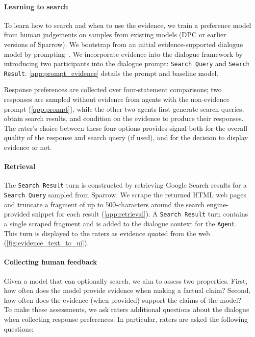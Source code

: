 \paragraph{Learning to search} To learn how to search and when to use the evidence, we train a preference model from human judgements on samples from existing models (DPC or earlier versions of Sparrow). We bootstrap from an initial evidence-supported dialogue model by prompting~\citep{lazaridou2022internet,menick2022teaching}. We incorporate evidence into the dialogue framework by introducing two participants into the dialogue prompt: \texttt{Search Query} and \texttt{Search Result}. \ref{app:prompt_evidence} details the prompt and baseline model.

Response preferences are collected over four-statement comparisons; two responses are sampled without evidence from agents with the non-evidence prompt (\ref{app:prompt}), while the other two agents first generate search queries, obtain search results, and condition on the evidence to produce their responses. The rater's choice between these four options provides signal both for the overall quality of the response and search query (if used), and for the decision to display evidence or not.

\paragraph{Retrieval} \label{itm:retrieval}

The \texttt{Search Result} turn is constructed by retrieving Google Search results for a \texttt{Search Query} sampled from Sparrow. We scrape the returned HTML web pages and truncate a fragment of up to 500-characters around the search engine-provided snippet for each result (\ref{app:retrieval}). A \texttt{Search Result} turn contains a single scraped fragment and is added to the dialogue context for the \texttt{Agent}. This turn is displayed to the raters as evidence quoted from the web (\ref{fig:evidence_text_to_ui}). 

\paragraph{Collecting human feedback} \label{itm:evidence-app}

Given a model that can optionally search, we aim to assess two properties. First, how often does the model provide evidence when making a factual claim? Second, how often does the evidence (when provided) support the claims of the model? To make these assessments, we ask raters additional questions about the dialogue when collecting response preferences. In particular, raters are asked the following questions:

